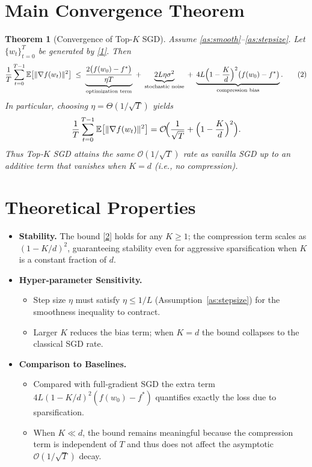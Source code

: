 \documentclass{article}
\newtheorem{theorem}{Theorem}
\newcommand{\E}{\mathbb{E}}
\begin{document}
\section*{Main Convergence Theorem}
\begin{theorem}[Convergence of Top‑$K$ SGD]\label{thm:main}
Assume \ref{as:smooth}–\ref{as:stepsize}. Let $\{w_{t}\}_{t=0}^{T}$ be generated by \eqref{1}. Then
\[
\frac{1}{T}\sum_{t=0}^{T-1}\E\big[\|\nabla f(w_{t})\|^{2}\big]
\;\le\;
\underbrace{\frac{2\big(f(w_{0})-f^{*}\big)}{\eta T}}_{\text{optimization term}}
\;+\;
\underbrace{2L\eta\sigma^{2}}_{\text{stochastic noise}}
\;+\;
\underbrace{4L\Bigl(1-\frac{K}{d}\Bigr)^{2}\big(f(w_{0})-f^{*}\big)}_{\text{compression bias}} .
\tag{2}
\]
In particular, choosing $\eta=\Theta(1/\sqrt{T})$ yields
\[
\frac{1}{T}\sum_{t=0}^{T-1}\E\big[\|\nabla f(w_{t})\|^{2}\big]=\mathcal{O}\!\Bigl(\frac{1}{\sqrt{T}}+\Bigl(1-\frac{K}{d}\Bigr)^{2}\Bigr).
\]
Thus Top‑$K$ SGD attains the same $\mathcal{O}(1/\sqrt{T})$ rate as vanilla SGD up to an additive term that vanishes when $K=d$ (i.e., no compression).
\end{theorem}

\section*{Theoretical Properties}
\begin{itemize}[leftmargin=*]
\item \textbf{Stability.} The bound \eqref{2} holds for any $K\ge1$; the compression term scales as $(1-K/d)^{2}$, guaranteeing stability even for aggressive sparsification when $K$ is a constant fraction of $d$.
\item \textbf{Hyper‑parameter Sensitivity.}
    \begin{itemize}
    \item Step size $\eta$ must satisfy $\eta\le 1/L$ (Assumption~\ref{as:stepsize}) for the smoothness inequality to contract.
    \item Larger $K$ reduces the bias term; when $K=d$ the bound collapses to the classical SGD rate.
    \end{itemize}
\item \textbf{Comparison to Baselines.}
    \begin{itemize}
    \item Compared with full‑gradient SGD the extra term $4L(1-K/d)^{2}(f(w_{0})-f^{*})$ quantifies exactly the loss due to sparsification.
    \item When $K\ll d$, the bound remains meaningful because the compression term is independent of $T$ and thus does not affect the asymptotic $\mathcal{O}(1/\sqrt{T})$ decay.
    \end{itemize}
\end{itemize}
\end{document}
